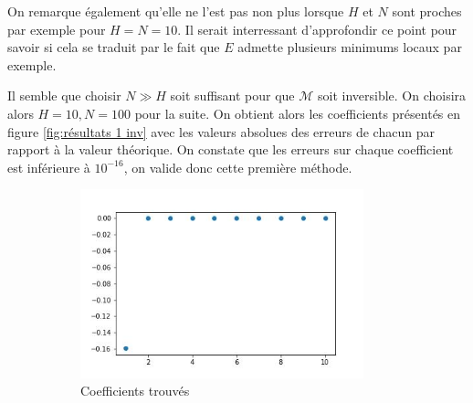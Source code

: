 \documentclass[12pt]{report}
\begin{document}
On remarque également qu'elle ne l'est pas non plus lorsque $H$ et $N$ sont proches par exemple pour $H=N=10$. 
Il serait interressant d'approfondir ce point pour savoir si cela se traduit par le fait que $E$ admette plusieurs minimums locaux par exemple.

Il semble que choisir $N\gg H$ soit suffisant pour que $\mathcal{M}$ soit inversible. 
On choisira alors $H=10, N=100$ pour la suite.
On obtient alors les coefficients présentés en figure \ref{fig:résultats 1 inv} avec les valeurs absolues des erreurs de chacun par rapport à la valeur théorique. 
On constate que les erreurs sur chaque coefficient est inférieure à $10^{-16}$, on valide donc cette première méthode.


\begin{figure}
    \centering
    \begin{subfigure}[b]{0.4\textwidth}
        \centering
        \includegraphics[width=0.9\textwidth, height=0.9\textwidth]{coefs_1_inv.jpg}
        \caption{Coefficients trouvés}
    \end{subfigure}
    \hfill
    \begin{subfigure}[b]{0.4\textwidth}
        \centering

\end{subfigure}
\end{figure}
\end{document}
